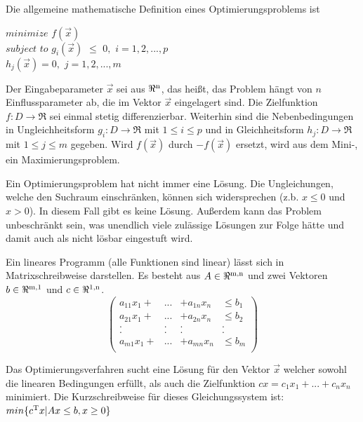 \documentclass{like}
\begin{document}
Die allgemeine mathematische Definition eines Optimierungsproblems ist

$minimize$  
\noindent\hspace*{3mm}%
$f(\vec{x}) $ \\
$subject$  $to$ 
\noindent\hspace*{3mm}%
$g_i(\vec{x})$ $\leq$ $0,$ $i=1,2,...,p$  \\
\noindent\hspace*{22mm}%
$h_j(\vec{x})= 0,$ $j= 1,2,...,m$\\ 
\noindent\hspace*{22mm}%


Der Eingabeparameter $\vec{x}$ sei aus $\Re \textsuperscript{n} $, das heißt, das Problem hängt von \(n\) Einflussparameter ab, die im Vektor $\vec{x}$ eingelagert sind. Die Zielfunktion $f:D \rightarrow \Re $ sei einmal stetig differenzierbar. Weiterhin sind die Nebenbedingungen in Ungleichheitsform $g_i:D \rightarrow \Re$ mit $1\leq i \leq p$ und in Gleichheitsform $h_j:D \rightarrow \Re$ mit $1\leq j \leq m$ gegeben.
Wird \(f(\vec{x})\) durch \(-f(\vec{x})\) ersetzt, wird aus dem Mini-, ein Maximierungsproblem.  

Ein Optimierungsproblem hat nicht immer eine Lösung. Die Ungleichungen, welche den Suchraum einschränken, können sich widersprechen (z.b. $x \leq 0 $ und $x > 0$). In diesem Fall gibt es keine Lösung. Außerdem kann das Problem unbeschränkt sein, was unendlich viele zulässige Lösungen zur Folge hätte und damit auch als nicht lösbar eingestuft wird. 

Ein lineares Programm (alle Funktionen sind linear) lässt sich in Matrixschreibweise darstellen. Es besteht aus $A \in \Re \textsuperscript{m,n}$ und zwei Vektoren $b \in \Re \textsuperscript{m,1}$ und $c \in \Re \textsuperscript{1,n}$. \\

\[ \left( \begin{array}{cccc}
a_{11} x_1 + & ... & + a_{1n} x_n & \leq b_1 \\   	
a_{21} x_1 + & ... & + a_{2n} x_n & \leq b_2 \\ 
. & . & . & . \\
. & . & . & . \\
a_{m1} x_1 + & ... & + a_{mn} x_n & \leq b_m \\
\end{array} \right)\] 

Das Optimierungsverfahren sucht eine Lösung für den Vektor \(\vec{x}\) welcher sowohl die linearen Bedingungen erfüllt, als auch die Zielfunktion 
$cx=c_1 x_1 + ... + c_n x_n$ minimiert.
Die Kurzschreibweise für dieses Gleichungssystem ist: \\
$min \{ c\textsuperscript{T}x | Ax \leq b, x \geq 0 \}$
\end{document}
